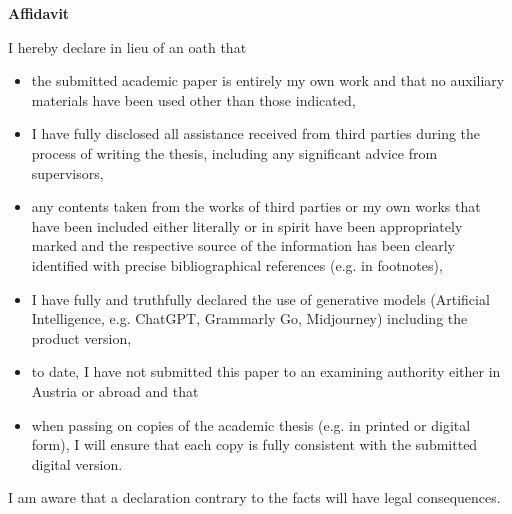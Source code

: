 {\Large
\noindent
{\bf Affidavit}} \\
\vspace*{0.3 cm}

\noindent
I hereby declare in lieu of an oath that
\begin{itemize}
    \item[-] the submitted academic paper is entirely my own work and that no auxiliary materials have been used other than those indicated,
    \item[-] I have fully disclosed all assistance received from third parties during the process of writing the thesis, including any significant advice from supervisors,
    \item[-] any contents taken from the works of third parties or my own works that have been included either literally or in spirit have been appropriately marked and the respective source of the information has been clearly identified with precise bibliographical references (e.g. in footnotes),
    \item[-] I have fully and truthfully declared the use of generative models (Artificial Intelligence, e.g. ChatGPT, Grammarly Go, Midjourney) including the product version,
    \item[-] to date, I have not submitted this paper to an examining authority either in Austria or abroad and that
    \item[-] when passing on copies of the academic thesis (e.g. in printed or digital form), I will ensure that each copy is fully consistent with the submitted digital version.
\end{itemize}

\noindent
I am aware that a declaration contrary to the facts will have legal consequences.\\\\\\\\

\noindent
\begin{table}[H]
\end{table}
